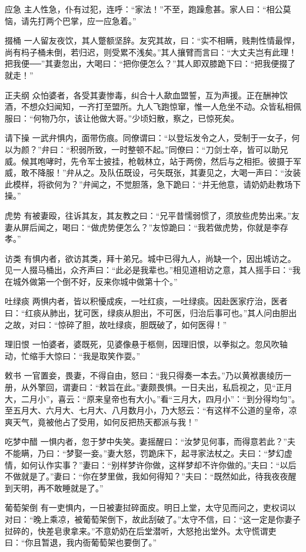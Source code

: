 \documentclass[12pt,UTF8]{ctexbook}
\begin{document}
应急
主人性急，仆有过犯，连呼：“家法！”不至，跑躁愈甚。家人曰：“相公莫恼，请先打两个巴掌，应一应急着。”

掇桶
一人留友夜饮，其人蹩额坚辞。友究其故，曰：“实不相瞒，贱荆性情最悍，尚有杩子桶未倒，若归迟，则受累不浅矣。”其人攘臂而言曰：“大丈夫岂有此理！把我便──”其妻忽出，大喝曰：“把你便怎么？”其人即双膝跪下曰：“把我便掇了就走！”

正夫纲
众怕婆者，各受其妻惨毒，纠合十人歃血盟誓，互为声援。正在酬神饮酒，不想众妇闻知，一齐打至盟所。九人飞跑惊窜，惟一人危坐不动。众皆私相佩服曰：“何物乃尔，该让他做大哥。”少顷妇散，察之，已惊死矣。

请下操
一武弁惧内，面带伤痕。同僚谓曰：“以登坛发令之人，受制于一女子，何以为颜？”弁曰：“积弱所致，一时整顿不起。”同僚曰：“刀剑士卒，皆可以助兄威。候其咆哮时，先令军士披挂，枪戟林立，站于两傍，然后与之相拒。彼摄于军威，敢不降服！”弁从之。及队伍既设，弓矢既张，其妻见之，大喝一声曰：“汝装此模样，将欲何为？”弁闻之，不觉胆落，急下跪曰：“并无他意，请奶奶赴教场下操。”

虎势
有被妻殴，往诉其友，其友教之曰：“兄平昔懦弱惯了，须放些虎势出来。”友妻从屏后闻之，喝曰：“做虎势便怎么？”友惊跪曰：“我若做虎势，你就是李存孝。”

访类
有惧内者，欲访其类，拜十弟兄。城中已得九人，尚缺一个，因出城访之。见一人掇马桶出，众齐声曰：“此必是我辈也。”相见道相访之意，其人摇手曰：“我在城外做第一个倒不好，反来你城中做第十个。”

吐绿痰
两惧内者，皆以积懮成疾，一吐红痰，一吐绿痰。因赴医家疗治，医者曰：“红痰从肺出，犹可医，绿痰从胆出，不可医，归治后事可也。”其人问由胆出之故，对曰：“惊碎了胆，故吐绿痰，胆既破了，如何医得！”

理旧恨
一怕婆者，婆既死，见婆像悬于柩侧，因理旧恨，以拳拟之。忽风吹轴动，忙缩手大惊曰：“我是取笑作耍。”

敕书
一官置妾，畏妻，不得自由，怒曰：“我只得奏一本去。”乃以黄袱裹绫历一册，从外擎回，谓妻曰：“敕旨在此。”妻颇畏惧。一日夫出，私启视之，见“正月大，二月小”，喜云：“原来皇帝也有大小。”看“三月大，四月小”：“到分得均匀”。至五月大、六月大、七月大、八月数月小，乃大怒云：“有这样不公道的皇帝，凉爽天气，竟被他占了受用，如何反把热天都派与我！”

吃梦中醋
一惧内者，忽于梦中失笑。妻摇醒曰：“汝梦见何事，而得意若此？”夫不能瞒，乃曰：“梦娶一妾。”妻大怒，罚跪床下，起寻家法杖之。夫曰：“梦幻虚情，如何认作实事？”妻曰：“别样梦许你做，这样梦却不许你做的。”夫曰：“以后不做就是了。”妻曰：“你在梦里做，我如何得知？”夫曰：“既然如此，待我夜夜醒到天明，再不敢睡就是了。”

葡萄架倒
有一吏惧内，一日被妻挝碎面皮。明日上堂，太守见而问之，吏权词以对曰：“晚上乘凉，被葡萄架倒下，故此刮破了。”太守不信，曰：“这一定是你妻子挝碎的，快差皂隶拿来。”不意奶奶在后堂潜听，大怒抢出堂外。太守慌谓吏曰：“你且暂退，我内衙葡萄架也要倒了。”
\end{document}
